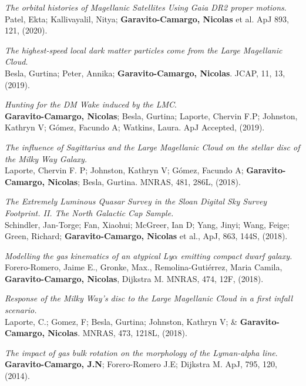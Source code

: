 \documentclass[UTF8]{article}
\begin{document}
\begin{etaremune}
\item \textit{The orbital histories of Magellanic Satellites Using Gaia DR2
  proper motions}. \\
  Patel, Ekta; Kallivayalil, Nitya; \textbf{Garavito-Camargo, Nicolas} et al.
  ApJ 893, 121, (2020).
\item \textit{The highest-speed local dark matter particles come from the Large
  Magellanic Cloud}. \\
  Besla, Gurtina; Peter, Annika; \textbf{Garavito-Camargo, Nicolas}. JCAP, 11,
  13, (2019).
\item \textit{Hunting for the DM Wake induced by the LMC}.\\
  \textbf{Garavito-Camargo, Nicolas}; Besla, Gurtina; Laporte, Chervin F.P;
  Johnston, Kathryn V; G\'omez, Facundo A; Watkins, Laura. ApJ Accepted, (2019).
\item \textit{The influence of Sagittarius and the Large Magellanic Cloud on the
  stellar disc of the Milky Way Galaxy.}\\
  Laporte, Chervin F. P; Johnston, Kathryn V; G\'omez, Facundo A; \textbf{Garavito-Camargo, Nicolas}; Besla,
  Gurtina. MNRAS, 481, 286L, (2018).
\item \textit{The Extremely Luminous Quasar Survey in the Sloan Digital Sky
  Survey Footprint. II. The North Galactic Cap Sample.}\\ Schindler, Jan-Torge;
  Fan, Xiaohui; McGreer, Ian D; Yang, Jinyi; Wang, Feige; Green, Richard;
  \textbf{Garavito-Camargo, Nicolas} et al., ApJ, 863, 144S, (2018).
\item \textit{Modelling the gas kinematics of an atypical Ly$\alpha$
emitting compact dwarf galaxy.}\\  Forero-Romero, Jaime E., Gronke, Max.,
Remolina-Gutiérrez, Maria Camila, \textbf{Garavito-Camargo, Nicolas}, Dijkstra
M. MNRAS, 474, 12F, (2018).
\item \textit{Response of the Milky Way's disc to the Large Magellanic Cloud in
  a first infall scenario.}\\ Laporte, C.; Gomez, F; Besla, Gurtina; Johnston,
  Kathryn V; \& \textbf{Garavito-Camargo, Nicolas}. MNRAS, 473, 1218L, (2018).
 \item \textit{The impact of gas bulk rotation on the morphology of the
   Lyman-alpha line}.\\ \textbf{Garavito-Camargo, J.N}; Forero-Romero J.E;
   Dijkstra M. ApJ, 795, 120, (2014).
\end{etaremune}
\end{document}
